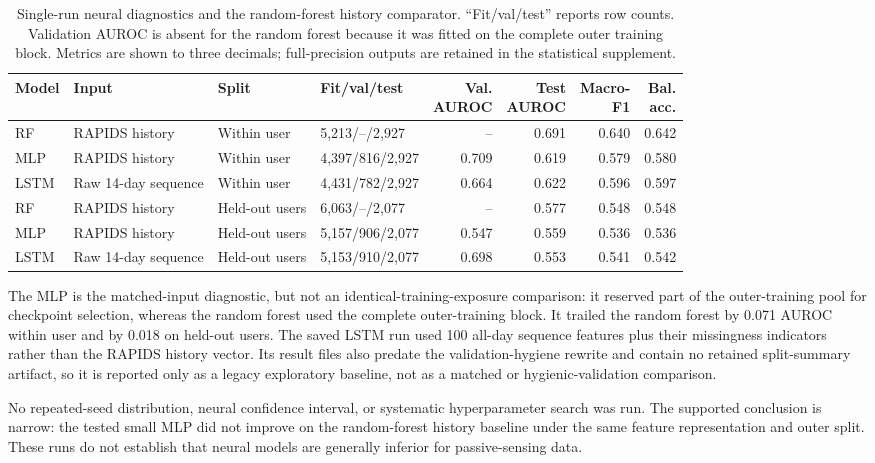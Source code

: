 \documentclass[a4paper,11pt,oneside]{report}
\begin{document}
\begin{table}[H]
\centering
\scriptsize
\setlength{\tabcolsep}{3pt}
\caption[Neural model-class diagnostics]{Single-run neural diagnostics and the
random-forest history comparator. ``Fit/val/test'' reports row counts. Validation
AUROC is absent for the random forest because it was fitted on the complete outer
training block. Metrics are shown to three decimals; full-precision outputs are
retained in the statistical supplement.}
\label{tab:neural-diagnostics}
\begin{tabular}{@{}llllrrrr@{}}
\toprule
Model & Input & Split & Fit/val/test & \makecell{Val.\\AUROC} &
\makecell{Test\\AUROC} & \makecell{Macro-\\F1} & \makecell{Bal.\\acc.} \\
\midrule
RF & RAPIDS history & Within user & 5,213/--/2,927 & -- & 0.691 & 0.640 & 0.642 \\
MLP & RAPIDS history & Within user & 4,397/816/2,927 & 0.709 & 0.619 & 0.579 & 0.580 \\
LSTM & Raw 14-day sequence & Within user & 4,431/782/2,927 & 0.664 & 0.622 & 0.596 & 0.597 \\
\addlinespace
RF & RAPIDS history & Held-out users & 6,063/--/2,077 & -- & 0.577 & 0.548 & 0.548 \\
MLP & RAPIDS history & Held-out users & 5,157/906/2,077 & 0.547 & 0.559 & 0.536 & 0.536 \\
LSTM & Raw 14-day sequence & Held-out users & 5,153/910/2,077 & 0.698 & 0.553 & 0.541 & 0.542 \\
\bottomrule
\end{tabular}
\end{table}

The MLP is the matched-input diagnostic, but not an identical-training-exposure
comparison: it reserved part of the outer-training pool for checkpoint selection,
whereas the random forest used the complete outer-training block. It trailed the
random forest by 0.071 AUROC within user and by 0.018 on held-out users. The saved
LSTM run used 100 all-day sequence features plus their missingness indicators rather
than the RAPIDS history vector. Its result files also predate the validation-hygiene
rewrite and contain no retained split-summary artifact, so it is reported only as a
legacy exploratory baseline, not as a matched or hygienic-validation comparison.

No repeated-seed distribution, neural confidence interval, or systematic
hyperparameter search was run. The supported conclusion is narrow: the tested small
MLP did not improve on the random-forest history baseline under the same feature
representation and outer split. These runs do not establish that neural models are
generally inferior for passive-sensing data.
\end{document}
